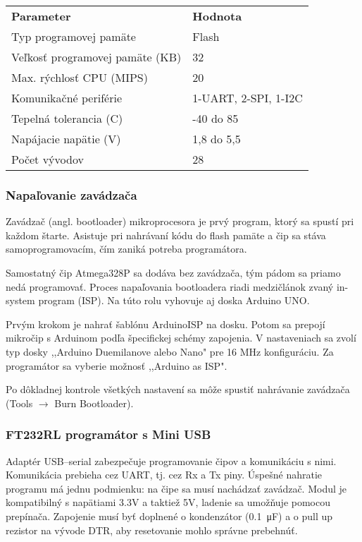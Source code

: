 \documentclass[titlepage]{article}
\begin{document}
\begin{table}[htb]
\begin{tabular}{ll}
\textbf{Parameter}              & \textbf{Hodnota}     \\
Typ programovej pamäte          & Flash                \\
Veľkosť programovej pamäte (KB) & 32                   \\
Max. rýchlosť CPU (MIPS)        & 20                   \\
Komunikačné periférie           & 1-UART, 2-SPI, 1-I2C \\
Tepelná tolerancia (C)          & -40 do 85            \\
Napájacie napätie (V)           & 1,8 do 5,5           \\
Počet vývodov                   & 28                  
\end{tabular}
\end{table}

\subsubsection*{Napaľovanie zavádzača}
Zavádzač (angl. bootloader) mikroprocesora je prvý program, ktorý sa spustí pri každom štarte. Asistuje pri nahrávaní kódu do flash pamäte a čip sa stáva samoprogramovacím, čím zaniká potreba programátora.

Samostatný čip Atmega328P sa dodáva bez zavádzača, tým pádom sa priamo nedá programovať. Proces napaľovania bootloadera riadi medzičlánok zvaný in-system program (ISP). Na túto rolu vyhovuje aj doska Arduino UNO.

Prvým krokom je nahrať šablónu ArduinoISP na dosku. Potom sa prepojí mikročip s Arduinom podľa špecifickej schémy zapojenia. V nastaveniach sa zvolí typ dosky ,,Arduino Duemilanove alebo Nano" pre 16 MHz konfiguráciu. Za programátor sa vyberie možnosť ,,Arduino as ISP".

Po dôkladnej kontrole všetkých nastavení sa môže spustiť nahrávanie zavádzača (Tools $\rightarrow$ Burn Bootloader).


\newpage
\subsubsection*{FT232RL programátor s Mini USB}
Adaptér USB–serial zabezpečuje programovanie čipov a komunikáciu s nimi. Komunikácia prebieha cez UART, tj. cez Rx a Tx piny. Úspešné nahratie programu má jednu podmienku: na čipe sa musí nachádzať zavádzač. Modul je kompatibilný s napätiami 3.3V a taktiež 5V, ladenie sa umožňuje pomocou prepínača. Zapojenie musí byť doplnené o kondenzátor (\SI{0,1}{\micro\F}) a o pull up rezistor na vývode DTR, aby resetovanie mohlo správne prebehnúť.
\end{document}
